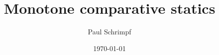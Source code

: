 
\usepackage{amsmath}
\usepackage{amsfonts}
\usepackage{graphicx}
\usepackage{hyperref}
\usepackage{multirow}
\usepackage{verbatim}

\usepackage{color}
\usepackage{ulem}

\AtBeginSection[] %
{ \frame{\sectionpage} }

\newcommand{\argmax}{\operatornamewithlimits{arg\,max}}
\newcommand{\argmin}{\operatornamewithlimits{arg\,min}}
\def\inprobLOW{\rightarrow_p}
\def\inprobHIGH{\,{\buildrel p \over \rightarrow}\,} 
\def\inprob{\,{\inprobHIGH}\,} 
\def\indist{\,{\buildrel d \over \rightarrow}\,} 
\def\F{\mathbb{F}}
\def\R{\mathbb{R}}
\newcommand{\gmatrix}[1]{\begin{pmatrix} {#1}_{11} & \cdots &
    {#1}_{1n} \\ \vdots & \ddots & \vdots \\ {#1}_{m1} & \cdots &
    {#1}_{mn} \end{pmatrix}}
\newcommand{\iprod}[2]{\left\langle {#1} , {#2} \right\rangle}
\newcommand{\norm}[1]{\left\Vert {#1} \right\Vert}
\newcommand{\abs}[1]{\left\vert {#1} \right\vert}
\renewcommand{\det}{\mathrm{det}}
\newcommand{\rank}{\mathrm{rank}}
\newcommand{\spn}{\mathrm{span}}
\newcommand{\row}{\mathrm{Row}}
\newcommand{\col}{\mathrm{Col}}
\renewcommand{\dim}{\mathrm{dim}}
\newcommand{\prefeq}{\succeq}
\newcommand{\pref}{\succ}
\newcommand{\seq}[1]{\{{#1}_n \}_{n=1}^\infty }
\renewcommand{\to}{{\rightarrow}}
\renewcommand{\L}{{\mathcal{L}}}
\newcommand{\Er}{\mathrm{E}}

\title{Monotone comparative statics}
\author{Paul Schrimpf}
\date{\today}



\frame{\titlepage}

